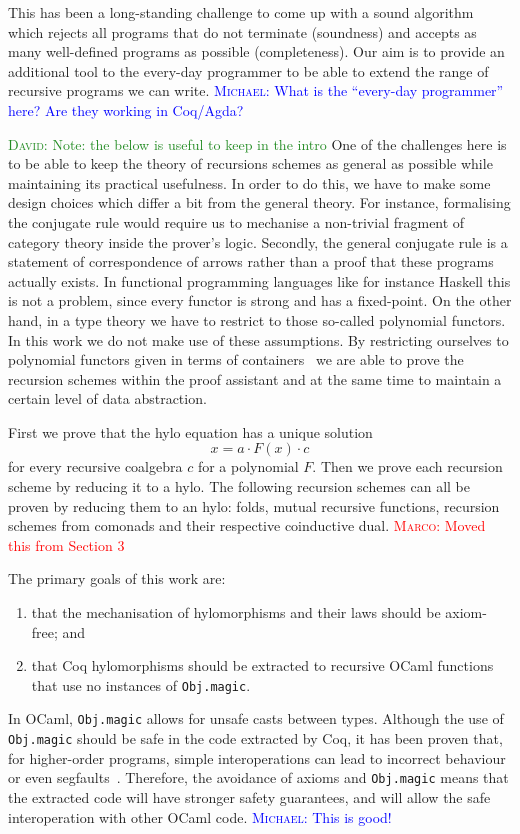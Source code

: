 \documentclass[a4paper, UKenglish, cleveref, autoref, thm-restate]{lipics-v2021}
\newcommand{\mpav}[1]{\textcolor{red}{\textsc{Marco}: #1}}
\newcommand{\dcas}[1]{\textcolor{ForestGreen}{\textsc{David}: #1}}
\newcommand{\mvol}[1]{\textcolor{blue}{\textsc{Michael}: #1}}
\newcommand{\comp}{\cdot}
\begin{document}
This has been a long-standing challenge to come up with a sound algorithm which
rejects all programs that do not terminate (soundness) and accepts as many
well-defined programs as possible (completeness). Our aim is to provide an
additional tool to the every-day programmer to be able to extend the range of
recursive programs we can write.
\mvol{What is the ``every-day programmer'' here? Are they working in Coq/Agda?}

\dcas{Note: the below is useful to keep in the intro}
One of the challenges here is to be able to keep the theory of recursions
schemes as general as possible while maintaining its practical usefulness. In
order to do this, we have to make some design choices which differ a bit from
the general theory.  For instance, formalising the conjugate rule would require
us to mechanise a non-trivial fragment of category theory inside the prover's
logic.  Secondly, the general conjugate rule is a statement of correspondence of
arrows rather than a proof that these programs actually exists. In functional
programming languages like for instance Haskell this is not a problem, since
every functor is strong and has a fixed-point.  On the other hand, in a type
theory we have to restrict to those so-called polynomial functors. In this work
we do not make use of these assumptions. By restricting ourselves to polynomial
functors given in terms of containers~\cite{AbbottAG05} we are able to prove the
recursion schemes within the proof assistant and at the same time to maintain a
certain level of data abstraction.

First we prove that the hylo equation has a unique solution
\[
  x = a \comp F(x) \comp c
\]
for every recursive coalgebra $c$ for a polynomial $F$. Then we prove each
recursion scheme by reducing it to a hylo. The following recursion schemes can
all be proven by reducing them to an hylo: folds, mutual recursive functions,
recursion schemes from comonads and their respective coinductive dual.
\mpav{Moved this from Section 3}

The primary goals of this work are:
\begin{enumerate}
  \item that the
  mechanisation of hylomorphisms and their laws should be axiom-free; and
  \item that Coq
hylomorphisms should be extracted to recursive OCaml functions that use no
instances of \texttt{Obj.magic}.
\end{enumerate}
In OCaml, \texttt{Obj.magic} allows for unsafe casts between types.
Although the use of \texttt{Obj.magic} should be safe in the code
extracted by Coq, it has been proven that, for higher-order programs, simple
interoperations can lead to incorrect behaviour or even
segfaults~\cite{forster:hal-04329663}. Therefore, the avoidance of axioms and
\texttt{Obj.magic} means that the extracted code will have stronger
safety guarantees, and will allow the safe interoperation with other OCaml code.
\mvol{This is good!}
\end{document}
